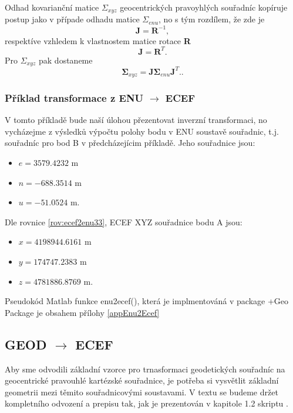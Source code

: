 Odhad kovarianční matice $\Sigma_{xyz}$ geocentrických pravoyhlých souřadníc kopíruje postup jako v případe odhadu matice $\Sigma_{enu}$, no s tým rozdílem, že zde je 
\begin{equation}
\mathbf{J} = \mathbf{R}^{-1},
\end{equation}
respektíve vzhledem k vlastnostem matice rotace \textbf{R}
\begin{equation}
\mathbf{J} = \mathbf{R}^{T}.
\end{equation}
Pro $\Sigma_{xyz}$ pak dostaneme
\begin{equation}
\mathbf{\Sigma}_{xyz} = \mathbf{J}\mathbf{\Sigma}_{enu}\mathbf{J}^{T}..
\end{equation}

\subsubsection{Příklad transformace z ENU $\rightarrow$ ECEF}

V tomto příkladě bude naší úlohou přezentovat inverzní transformaci, no vycházejme z výsledků výpočtu polohy bodu v ENU soustavě souřadnic, t.j. souřadníc pro bod B v předcházejícim příkladě. Jeho souřadnice jsou:

\begin{itemize}
\item $e = 3579.4232$ m
\item $n = -688.3514$ m
\item $u = -51.0524$ m.
\end{itemize}


Dle rovnice \ref{rov:ecef2enu33}, ECEF XYZ souřadnice bodu A jsou:
\begin{itemize}
\item $x = 4198944.6161$ m
\item $y = 174747.2383$ m
\item $z = 4781886.8769$ m.
\end{itemize}

Pseudokód Matlab funkce enu2ecef(), která je implmentováná v package +Geo Package je obsahem přílohy \ref{appEnu2Ecef}

\subsection{GEOD $\rightarrow$ ECEF}

Aby sme odvodili základní vzorce pro trnasformaci geodetických souřadníc na geocentrické pravouhlé kartézské souřadnice, je potřeba si vysvětlit základní geometrii mezi těmito souřadnicovými soustavami. V textu se budeme držet kompletního odvození a prepisu tak, jak je prezentován v kapitole 1.2 skriptu \cite{Cimbalnik1997}.

